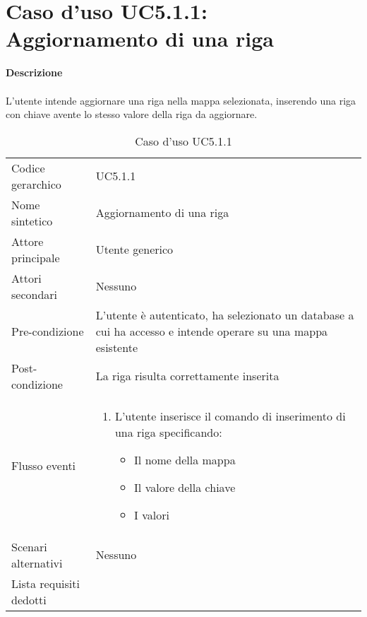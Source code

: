 \documentclass[a4paper]{report}
\begin{document}
	 \section{Caso d'uso UC5.1.1: Aggiornamento di una riga}
	 \textbf{Descrizione} \\ \\
	 L'utente intende aggiornare una riga nella mappa selezionata, inserendo una riga con chiave avente lo
	  stesso valore della riga da aggiornare.
		\begin{table}[H]
		\begin{tabularx}{\textwidth}{X | X}\toprule
			\rowcolor{orange!65}Codice gerarchico & UC5.1.1\\
			Nome sintetico & Aggiornamento di una riga\\
			\rowcolor{orange!65}Attore principale & Utente generico\\
			Attori secondari & Nessuno \\
			\rowcolor{orange!65}Pre-condizione & L'utente è autenticato, ha selezionato un database a cui ha 
			accesso e intende operare su una mappa esistente \\
			Post-condizione & La riga risulta correttamente inserita\\
			\rowcolor{orange!65}Flusso eventi & \begin{enumerate}
			\item L'utente inserisce il comando di inserimento di una riga specificando:
			\begin{itemize}
				\item Il nome della mappa
				\item Il valore della chiave
				\item I valori
			\end{itemize}
			\end{enumerate} \\
			Scenari alternativi & Nessuno \\
			\rowcolor{orange!65}Lista requisiti dedotti & \\
			\bottomrule
		\end{tabularx}
		\caption{Caso d'uso UC5.1.1}
	 \end{table}
\end{document}
